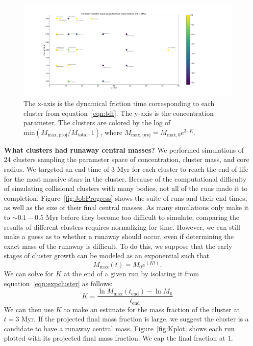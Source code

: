 \documentclass[preprint1]{aastex}
\newcommand\Myr{\mbox{ Myr}}
\numberwithin{equation}{section}
\begin{document}
\begin{figure}
    \includegraphics[width=20cm]{kplot}
    \caption{The x-axis is the dynamical friction time corresponding to each cluster from equation~\ref{eqn:tdf}.  The y-axis is the concentration parameter.  The clusters are colored by the log of $\mathrm{min}(M_{\mathrm{max, proj}}/M_{\mathrm{total}}, 1)$, where $M_{\mathrm{max, proj}} = M_{\mathrm{max}, 0}e^{3 \cdot K}$. }
    \label{fig:KPlot}
\end{figure}
\textbf{What clusters had runaway central masses?}
We performed simulations of 24 clusters sampling the parameter space of concentration, cluster mass, and core radius. We targeted an end time of $3 \Myr$ for each cluster to reach the end of life for the most massive stars in the cluster. Because of the computational difficulty of simulating collisional clusters with many bodies, not all of the runs made it to completion. Figure~\ref{fig:JobProgress} shows the suite of runs and their end times, as well as the size of their final central masses. As many simulations only make it to $\sim 0.1 - 0.5 \Myr$ before they become too difficult to simulate, comparing the results of different clusters requires normalizing for time.  However, we can still make a guess as to whether a runaway should occur, even if determining the exact mass of the runaway is difficult. To do this, we suppose that the early stages of cluster growth can be modeled as an exponential such that
\begin{equation}
    M_{\mathrm{max}}(t) = M_{0} e^{(Kt)}.
    \label{eqn:expcluster}
\end{equation}
We can solve for $K$ at the end of a given run by isolating it from equation~\ref{eqn:expcluster} as follows:
\begin{equation}
K = \frac{\ln M_{\mathrm{max}}(t_{\mathrm{end}}) - \ln M_{0}}{t_{\mathrm{end}}}
\end{equation}
We can then use $K$ to make an estimate for the mass fraction of the cluster at $t = 3 \Myr$.  If the projected final mass fraction is large, we suggest the cluster is a candidate to have a runaway central mass. Figure~\ref{fig:Kplot} shows each run plotted with its projected final mass fraction.  We cap the final fraction at $1$.
\end{document}
